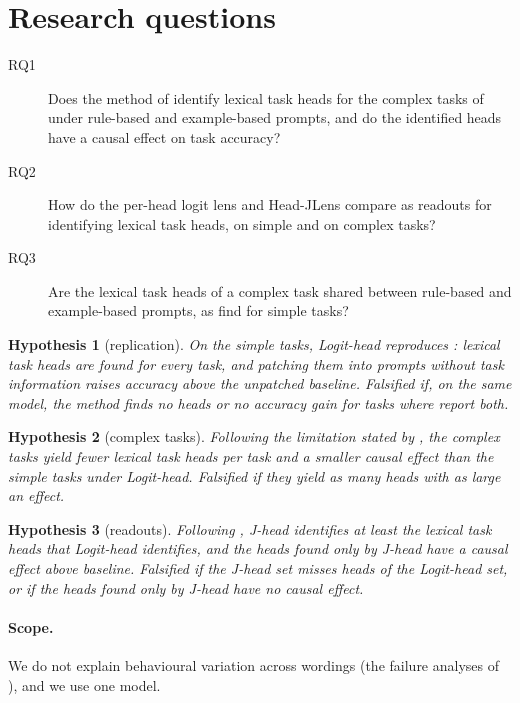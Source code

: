 \documentclass[11pt,a4paper]{article}
\newtheorem{hypothesis}{Hypothesis}
\begin{document}
\section{Research questions}\label{sec:rq}
\begin{description}
\item[RQ1] Does the method of \citet{yang2026shared} identify lexical task heads for the complex tasks of \citet{fu2026rules} under rule-based and example-based prompts, and do the identified heads have a causal effect on task accuracy?
\item[RQ2] How do the per-head logit lens and Head-JLens compare as readouts for identifying lexical task heads, on simple and on complex tasks?
\item[RQ3] Are the lexical task heads of a complex task shared between rule-based and example-based prompts, as \citet{yang2026shared} find for simple tasks?
\end{description}

\begin{hypothesis}[replication]\label{h:rep}
On the simple tasks, Logit-head reproduces \citet{yang2026shared}: lexical task heads are found for every task, and patching them into prompts without task information raises accuracy above the unpatched baseline. \emph{Falsified} if, on the same model, the method finds no heads or no accuracy gain for tasks where \citet{yang2026shared} report both.
\end{hypothesis}

\begin{hypothesis}[complex tasks]\label{h:complex}
Following the limitation stated by \citet[Sec.~4]{yang2026shared}, the complex tasks yield fewer lexical task heads per task and a smaller causal effect than the simple tasks under Logit-head. \emph{Falsified} if they yield as many heads with as large an effect.
\end{hypothesis}

\begin{hypothesis}[readouts]\label{h:readout}
Following \citet{merlo2026headjlens}, J-head identifies at least the lexical task heads that Logit-head identifies, and the heads found only by J-head have a causal effect above baseline. \emph{Falsified} if the J-head set misses heads of the Logit-head set, or if the heads found only by J-head have no causal effect.
\end{hypothesis}

\paragraph{Scope.} We do not explain behavioural variation across wordings (the failure analyses of \citealp[Sec.~2.4]{yang2026shared}), and we use one model.
\end{document}
